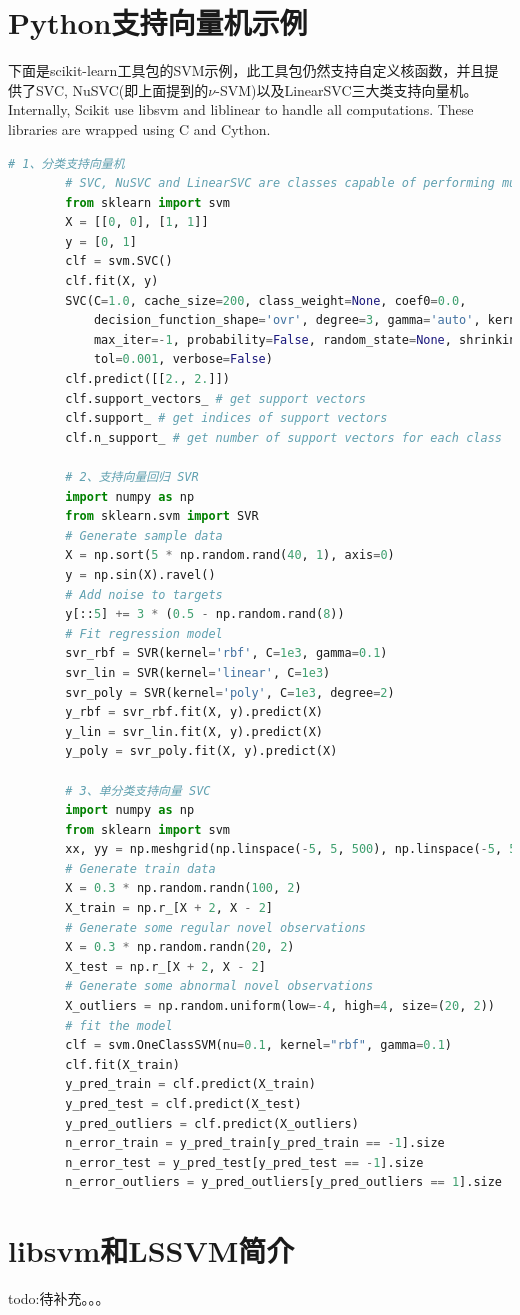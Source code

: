 \section{Python支持向量机示例}
    \par
    下面是scikit-learn工具包的SVM示例，此工具包仍然支持自定义核函数，并且提供了SVC, NuSVC(即上面提到的$\nu$-SVM)以及LinearSVC三大类支持向量机。Internally, Scikit use libsvm and liblinear to handle all computations. These libraries are wrapped using C and Cython.
    \begin{lstlisting}[language = Python]
        # 1、分类支持向量机
        # SVC, NuSVC and LinearSVC are classes capable of performing multi-class classification on a dataset.
        from sklearn import svm
        X = [[0, 0], [1, 1]]
        y = [0, 1]
        clf = svm.SVC()
        clf.fit(X, y)
        SVC(C=1.0, cache_size=200, class_weight=None, coef0=0.0,
            decision_function_shape='ovr', degree=3, gamma='auto', kernel='rbf',
            max_iter=-1, probability=False, random_state=None, shrinking=True,
            tol=0.001, verbose=False)
        clf.predict([[2., 2.]])
        clf.support_vectors_ # get support vectors
        clf.support_ # get indices of support vectors
        clf.n_support_ # get number of support vectors for each class

        # 2、支持向量回归 SVR
        import numpy as np
        from sklearn.svm import SVR
        # Generate sample data
        X = np.sort(5 * np.random.rand(40, 1), axis=0)
        y = np.sin(X).ravel()
        # Add noise to targets
        y[::5] += 3 * (0.5 - np.random.rand(8))
        # Fit regression model
        svr_rbf = SVR(kernel='rbf', C=1e3, gamma=0.1)
        svr_lin = SVR(kernel='linear', C=1e3)
        svr_poly = SVR(kernel='poly', C=1e3, degree=2)
        y_rbf = svr_rbf.fit(X, y).predict(X)
        y_lin = svr_lin.fit(X, y).predict(X)
        y_poly = svr_poly.fit(X, y).predict(X)

        # 3、单分类支持向量 SVC
        import numpy as np
        from sklearn import svm
        xx, yy = np.meshgrid(np.linspace(-5, 5, 500), np.linspace(-5, 5, 500))
        # Generate train data
        X = 0.3 * np.random.randn(100, 2)
        X_train = np.r_[X + 2, X - 2]
        # Generate some regular novel observations
        X = 0.3 * np.random.randn(20, 2)
        X_test = np.r_[X + 2, X - 2]
        # Generate some abnormal novel observations
        X_outliers = np.random.uniform(low=-4, high=4, size=(20, 2))
        # fit the model
        clf = svm.OneClassSVM(nu=0.1, kernel="rbf", gamma=0.1)
        clf.fit(X_train)
        y_pred_train = clf.predict(X_train)
        y_pred_test = clf.predict(X_test)
        y_pred_outliers = clf.predict(X_outliers)
        n_error_train = y_pred_train[y_pred_train == -1].size
        n_error_test = y_pred_test[y_pred_test == -1].size
        n_error_outliers = y_pred_outliers[y_pred_outliers == 1].size
    \end{lstlisting}

\section{libsvm和LSSVM简介}
    \par
    todo:待补充。。。
% 
